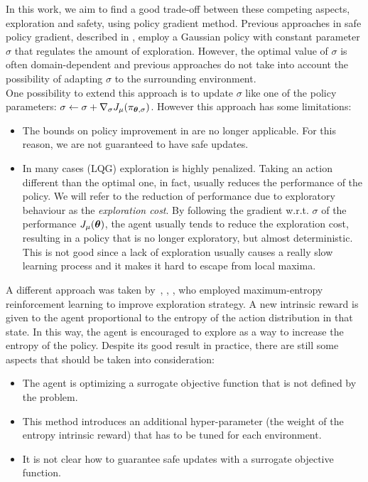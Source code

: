 In this work, we aim to find a good trade-off between these competing aspects, exploration and safety, using policy gradient method. Previous approaches in safe policy gradient, described in , employ a Gaussian policy with constant parameter $\sigma$ that regulates the amount of exploration. However, the optimal value of $\sigma$ is often domain-dependent and previous approaches do not take into account the possibility of adapting $\sigma$ to the surrounding environment.\\
One possibility to extend this approach is to update $\sigma$ like one of the policy parameters: $\sigma \gets \sigma + \nabla_\sigma J_\mu(\pi_{{\boldsymbol{\theta}},\sigma})$. However this approach has some limitations:
\begin{itemize}
\item The bounds on policy improvement in \cite{adaptive_step} are no longer applicable. For this reason, we are not guaranteed to have safe updates.
\item In many cases (\eg LQG) exploration is highly penalized. Taking an action different than the optimal one, in fact, usually reduces the performance of the policy. We will refer to the reduction of performance due to exploratory behaviour as the \textit{exploration cost}. By following the gradient w.r.t. $\sigma$ of the performance $J_\mu({\boldsymbol{\theta}})$, the agent usually tends to reduce the exploration cost, resulting in a policy that is no longer exploratory, but almost deterministic. This is not good since a lack of exploration usually causes a really slow learning process and it makes it hard to escape from local maxima.
\end{itemize}

A different approach was taken by~\cite{haarnoja_reinforcement_2017}, \cite{ziebart_maximum_2008}, \cite{haarnoja2018soft}, who employed maximum-entropy reinforcement learning to improve exploration strategy. A new intrinsic reward is given to the agent proportional to the entropy of the action distribution in that state. In this way, the agent is encouraged to explore as a way to increase the entropy of the policy. Despite its good result in practice, there are still some aspects that should be taken into consideration:
\begin{itemize}
\item The agent is optimizing a surrogate objective function that is not defined by the problem.
\item This method introduces an additional hyper-parameter (the weight of the entropy intrinsic reward) that has to be tuned for each environment.
\item It is not clear how to guarantee safe updates with a surrogate objective function.
\end{itemize}

